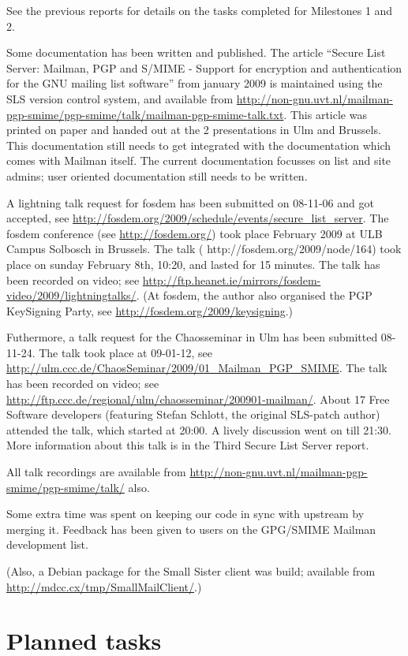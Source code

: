 \documentclass[a4]{article}
\begin{document}
See the previous reports for details on the tasks completed for
Milestones 1 and 2.

Some documentation has been written and published.  The article ``Secure List
Server: Mailman, PGP and S/MIME - Support for encryption and authentication for
the GNU mailing list software'' from january 2009 is maintained using the SLS
version control system, and available from
\url{http://non-gnu.uvt.nl/mailman-pgp-smime/pgp-smime/talk/mailman-pgp-smime-talk.txt}.
This article was printed on paper and handed out at the 2 presentations in Ulm
and Brussels.  This documentation still needs to get integrated with the
documentation which comes with Mailman itself.  The current documentation
focusses on list and site admins; user oriented documentation still needs to be
written.

A lightning talk request for fosdem has been submitted on 08-11-06 and got
accepted, see \url{http://fosdem.org/2009/schedule/events/secure_list_server}.
The fosdem conference (see \url{http://fosdem.org/}) took place February 2009
at ULB Campus Solbosch in Brussels.  The talk (
http://fosdem.org/2009/node/164) took place on sunday February 8th, 10:20, and
lasted for 15 minutes.  The talk has been recorded on video; see
\url{http://ftp.heanet.ie/mirrors/fosdem-video/2009/lightningtalks/}.  (At
fosdem, the author also organised the PGP KeySigning Party, see
\url{http://fosdem.org/2009/keysigning}.)

Futhermore, a talk request for the Chaosseminar in Ulm has been submitted
08-11-24.  The talk took place at 09-01-12, see
\url{http://ulm.ccc.de/ChaosSeminar/2009/01_Mailman_PGP_SMIME}.  The talk has
been recorded on video; see
\url{http://ftp.ccc.de/regional/ulm/chaosseminar/200901-mailman/}.  About 17
Free Software developers (featuring Stefan Schlott, the original SLS-patch
author) attended the talk, which started at 20:00.  A lively discussion went on
till 21:30.  More information about this talk is in the Third Secure List
Server report.

All talk recordings are available from
\url{http://non-gnu.uvt.nl/mailman-pgp-smime/pgp-smime/talk/} also.

Some extra time was spent on keeping our code in sync with upstream by merging
it.  Feedback has been given to users on the GPG/SMIME Mailman development
list.

(Also, a Debian package for the Small Sister client was build; available from
\url{http://mdcc.cx/tmp/SmallMailClient/}.)


\section{Planned tasks}
\end{document}
